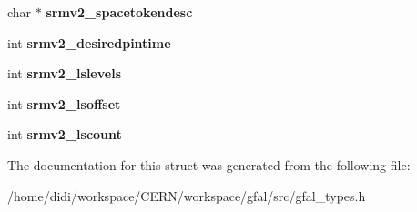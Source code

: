 \begin{DoxyCompactItemize}
\item 
char $\ast$ {\bfseries srmv2\_\-spacetokendesc}\label{structgfal__request___a7370f1e2e6e0d4deb4ca1db1eab03cb3}

\item 
int {\bfseries srmv2\_\-desiredpintime}\label{structgfal__request___a590a10b1c9eddda4f4436b2228300a54}

\item 
int {\bfseries srmv2\_\-lslevels}\label{structgfal__request___a090863f3279c65a1703c36e241699ece}

\item 
int {\bfseries srmv2\_\-lsoffset}\label{structgfal__request___a05b8407be554d2930964025616ef2371}

\item 
int {\bfseries srmv2\_\-lscount}\label{structgfal__request___a5d06153c19a458bb3ae74556d40c5cba}

\end{DoxyCompactItemize}


The documentation for this struct was generated from the following file:\begin{DoxyCompactItemize}
\item 
/home/didi/workspace/CERN/workspace/gfal/src/gfal\_\-types.h\end{DoxyCompactItemize}
